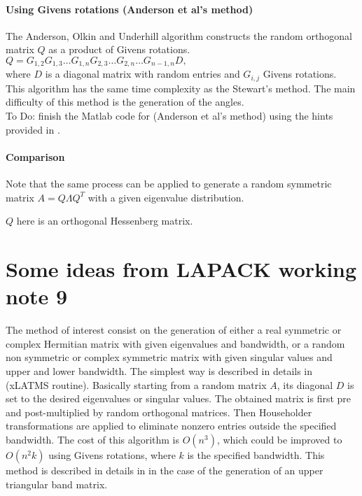 \documentclass[a4paper]{article}
\begin{document}
\paragraph{Using Givens rotations (Anderson et al's method)\cite{doi:10.1137/0908055} \\}
The Anderson, Olkin and Underhill algorithm constructs the random orthogonal matrix $Q$ as 
a product of Givens rotations.\\

$Q = G_{1,2}G_{1,3} \ldots G_{1,n}G_{2,3} \ldots G_{2,n} \ldots G_{n-1,n} D,$\\

where $D$ is a diagonal matrix with random entries and $G_{i,j}$ Givens rotations.
This algorithm has the same time complexity as the Stewart's method. The main difficulty 
of this method is the generation of the angles.\\

{\color{red}To Do: finish the Matlab code for (Anderson et al's method) using the hints provided in \cite{Genz_methodsfor}.}
\paragraph{Comparison \\}
 

Note that the same process can be applied to generate a random symmetric matrix $A = Q \Lambda Q^T$ with a given eigenvalue distribution.

$Q$ here is an orthogonal Hessenberg matrix.

\section{Some ideas from LAPACK working note 9 \cite{lawn09}}
The method of interest consist on the generation of either a real symmetric or complex Hermitian 
matrix with given eigenvalues and bandwidth, or a random non symmetric or complex symmetric matrix
with given singular values and upper and lower bandwidth. The simplest way is described in details 
in \cite[section 3]{lawn09} (xLATMS routine). Basically starting from a random matrix $A$, its diagonal $D$ 
is set to the desired eigenvalues or singular values. The obtained matrix is first pre and post-multiplied 
by random orthogonal matrices. Then Householder transformations are applied to eliminate nonzero entries 
outside the specified bandwidth. The cost of this algorithm is $O(n^3)$, which could be improved to $O(n^2k)$ 
using Givens rotations, where $k$ is the specified bandwidth. This method is described in details in
 \cite[section 9.2]{lawn09} in the case of the generation of an upper triangular band matrix.\\
\end{document}
